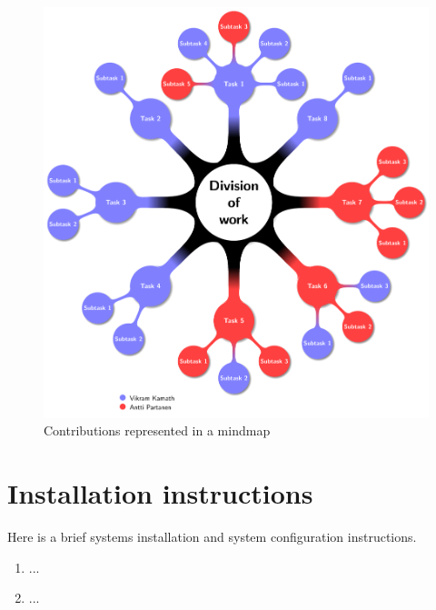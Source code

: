 \begin{figure}[p]
    \centering
    \includegraphics[scale=0.6]{contributions_tree.pdf}
    \caption{Contributions represented in a mindmap}
    \label{fig:contributions_tree}
\end{figure}
\FloatBarrier



\nocite{*}




\appendix
\section{Installation instructions} \label{App:instructions}


Here is a brief systems installation and system configuration instructions. 

\begin{enumerate}

\item ...
\item ...

\end{enumerate}

